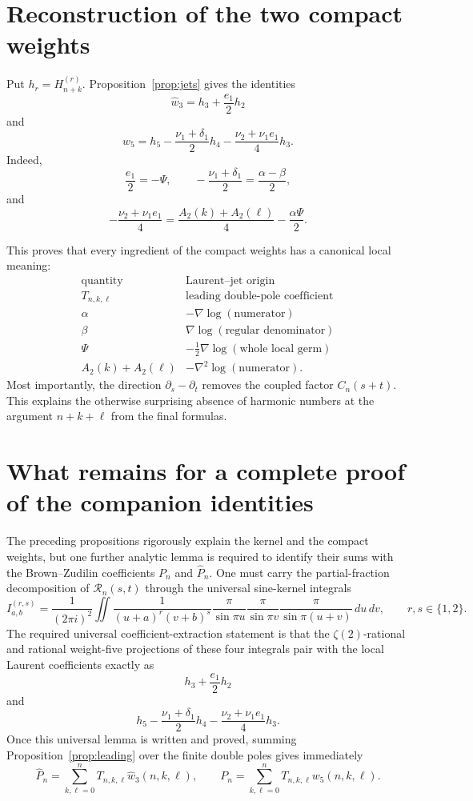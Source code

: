 \documentclass[11pt]{article}
\newcommand{\Hh}[2]{H_{#1}^{(#2)}}
\begin{document}
\section{Reconstruction of the two compact weights}

Put \(h_r=\Hh{n+k}{r}\).  Proposition~\ref{prop:jets} gives the identities
\[
 \boxed{\quad
 \widehat w_3=h_3+\frac{e_1}{2}h_2
 \quad}
\]
and
\[
 \boxed{\quad
 w_5
 =h_5-\frac{\nu_1+\delta_1}{2}h_4
 -\frac{\nu_2+\nu_1e_1}{4}h_3.
 \quad}
\]
Indeed,
\[
 \frac{e_1}{2}=-\Psi,\qquad
 -\frac{\nu_1+\delta_1}{2}
 =\frac{\alpha-\beta}{2},
\]
and
\[
 -\frac{\nu_2+\nu_1e_1}{4}
 =
 \frac{A_2(k)+A_2(\ell)}4-\frac{\alpha\Psi}{2}.
\]

This proves that every ingredient of the compact weights has a canonical
local meaning:
\[
\begin{array}{c|c}
\text{quantity}&\text{Laurent--jet origin}\\ \hline
T_{n,k,\ell}&\text{leading double-pole coefficient}\\
\alpha&-\nabla\log(\text{numerator})\\
\beta&\nabla\log(\text{regular denominator})\\
\Psi&-\frac12\nabla\log(\text{whole local germ})\\
A_2(k)+A_2(\ell)&-\nabla^2\log(\text{numerator}).
\end{array}
\]
Most importantly, the direction \(\partial_s-\partial_t\) removes the coupled
factor \(C_n(s+t)\).  This explains the otherwise surprising absence of
harmonic numbers at the argument \(n+k+\ell\) from the final formulas.

\section{What remains for a complete proof of the companion identities}

The preceding propositions rigorously explain the kernel and the compact
weights, but one further analytic lemma is required to identify their sums
with the Brown--Zudilin coefficients \(P_n\) and \(\widehat P_n\).
One must carry the partial-fraction decomposition of \(\mathcal R_n(s,t)\)
through the universal sine-kernel integrals
\[
 I_{a,b}^{(r,s)}
 =
 \frac1{(2\pi i)^2}
 \iint
 \frac{1}{(u+a)^r(v+b)^s}
 \frac{\pi}{\sin\pi u}
 \frac{\pi}{\sin\pi v}
 \frac{\pi}{\sin\pi(u+v)}
 \,du\,dv,
\qquad r,s\in\{1,2\}.
\]
The required universal coefficient-extraction statement is that the
\(\zeta(2)\)-rational and rational weight-five projections of these four
integrals pair with the local Laurent coefficients exactly as
\[
 h_3+\frac{e_1}{2}h_2
\]
and
\[
 h_5-\frac{\nu_1+\delta_1}{2}h_4
 -\frac{\nu_2+\nu_1e_1}{4}h_3.
\]
Once this universal lemma is written and proved, summing
Proposition~\ref{prop:leading} over the finite double poles gives immediately
\[
 \widehat P_n=\sum_{k,\ell=0}^nT_{n,k,\ell}\widehat w_3(n,k,\ell),
\qquad
 P_n=\sum_{k,\ell=0}^nT_{n,k,\ell}w_5(n,k,\ell).
\]
\end{document}

